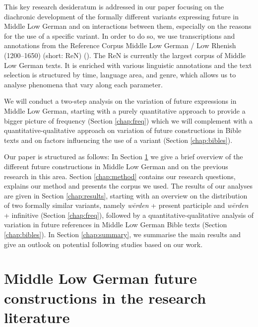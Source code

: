 \documentclass[output=paper,colorlinks,citecolor=brown]{langscibook}
\begin{document}
This key research desideratum is addressed in our paper focusing on the diachronic development of the formally different variants expressing future in Middle Low German and on interactions between them, especially on the reasons for the use of a specific variant. In order to do so, we use transcriptions and annotations from the Reference Corpus Middle Low German / Low Rhenish (1200–1650) (short: ReN) (\cite{ReNTeam2021}). The ReN is currently the largest corpus of Middle Low German texts. It is enriched with various linguistic annotations and the text selection is structured by time, language area, and genre, which allows us to analyse phenomena that vary along each parameter.

We will conduct a two-step analysis on the variation of future expressions in Middle Low German, starting with a purely quantitative approach to provide a bigger picture of frequency (Section \ref{chap:freq}) which we will complement with a quantitative-qualitative approach on variation of future constructions in Bible texts and on factors influencing the use of a variant (Section \ref{chap:bibles}).

Our paper is structured as follows: In Section \ref{chap:lit} we give a brief overview of the different future constructions in Middle Low German and on the previous research in this area. Section \ref{chap:method} contains our research questions, explains our method and presents the corpus we used. The results of our analyses are given in Section \ref{chap:results}, starting with an overview on the distribution of two formally similar variants, namely \textit{wērden} + present participle and \textit{wērden} + infinitive (Section \ref{chap:freq}), followed by a quantitative-qualitative analysis of variation in future references in Middle Low German Bible texts (Section \ref{chap:bibles}). In Section \ref{chap:summary}, we summarise the main results and give an outlook on potential following studies based on our work.

\is{} %

\section{Middle Low German future constructions in the research literature}\label{chap:lit}
\end{document}
